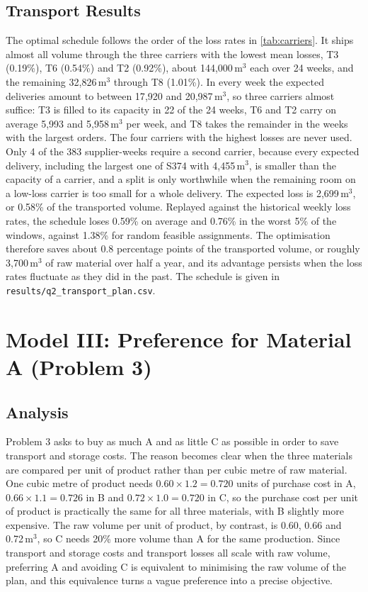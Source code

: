\documentclass[11pt,a4paper]{article}
\begin{document}
\subsection{Transport Results}
The optimal schedule follows the order of the loss rates in \cref{tab:carriers}.
It ships almost all volume through the three carriers with the lowest mean losses, T3 (0.19\%), T6 (0.54\%) and T2 (0.92\%), about 144{,}000\,m$^3$ each over 24 weeks, and the remaining 32{,}826\,m$^3$ through T8 (1.01\%).
In every week the expected deliveries amount to between 17{,}920 and 20{,}987\,m$^3$, so three carriers almost suffice: T3 is filled to its capacity in 22 of the 24 weeks, T6 and T2 carry on average 5{,}993 and 5{,}958\,m$^3$ per week, and T8 takes the remainder in the weeks with the largest orders.
The four carriers with the highest losses are never used.
Only 4 of the 383 supplier-weeks require a second carrier, because every expected delivery, including the largest one of S374 with 4{,}455\,m$^3$, is smaller than the capacity of a carrier, and a split is only worthwhile when the remaining room on a low-loss carrier is too small for a whole delivery.
The expected loss is 2{,}699\,m$^3$, or 0.58\% of the transported volume.
Replayed against the historical weekly loss rates, the schedule loses 0.59\% on average and 0.76\% in the worst 5\% of the windows, against 1.38\% for random feasible assignments.
The optimisation therefore saves about 0.8 percentage points of the transported volume, or roughly 3{,}700\,m$^3$ of raw material over half a year, and its advantage persists when the loss rates fluctuate as they did in the past.
The schedule is given in \texttt{results/q2\_transport\_plan.csv}.

\section{Model III: Preference for Material A (Problem 3)}\label{sec:q3}

\subsection{Analysis}
Problem 3 asks to buy as much A and as little C as possible in order to save transport and storage costs.
The reason becomes clear when the three materials are compared per unit of product rather than per cubic metre of raw material.
One cubic metre of product needs $0.60\times1.2=0.720$ units of purchase cost in A, $0.66\times1.1=0.726$ in B and $0.72\times1.0=0.720$ in C, so the purchase cost per unit of product is practically the same for all three materials, with B slightly more expensive.
The raw volume per unit of product, by contrast, is 0.60, 0.66 and 0.72\,m$^3$, so C needs 20\% more volume than A for the same production.
Since transport and storage costs and transport losses all scale with raw volume, preferring A and avoiding C is equivalent to minimising the raw volume of the plan, and this equivalence turns a vague preference into a precise objective.
\end{document}
